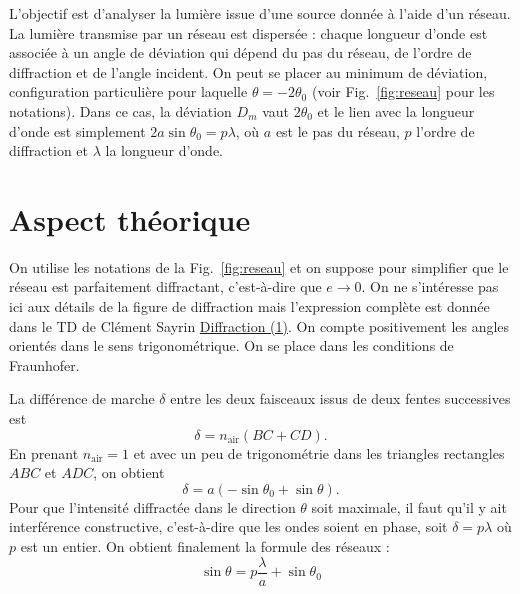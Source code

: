 \documentclass[12pt,a4paper]{article}
\begin{document}
L'objectif est d'analyser la lumière issue d'une source donnée à l'aide d'un réseau.
La lumière transmise par un réseau est dispersée : chaque longueur d'onde est associée à un angle de déviation qui dépend du pas du réseau, de l'ordre de diffraction et de l'angle incident.
On peut se placer au minimum de déviation, configuration particulière pour laquelle $\theta = -2\theta_0$ (voir Fig.~\ref{fig:reseau} pour les notations).
Dans ce cas, la déviation $D_m$ vaut $2\theta_0$ et le lien avec la longueur d'onde est simplement $2a\sin\theta_0=p\lambda$, où $a$ est le pas du réseau, $p$ l'ordre de diffraction et $\lambda$ la longueur d'onde.

\section{Aspect théorique}

On utilise les notations de la Fig.~\ref{fig:reseau} et on suppose pour simplifier que le réseau est parfaitement diffractant, c'est-à-dire que $e \rightarrow 0$.
On ne s'intéresse pas ici aux détails de la figure de diffraction mais l'expression complète est donnée dans le TD de Clément Sayrin \href{http://www.lkb.upmc.fr/cqed/wp-content/uploads/sites/14/2019/10/optique_TD_diffraction_1_corrige.pdf}{Diffraction (1)}.
On compte positivement les angles orientés dans le sens trigonométrique.
On se place dans les conditions de Fraunhofer.

La différence de marche $\delta$ entre les deux faisceaux issus de deux fentes successives est
\begin{equation}
\delta = n_\mathrm{air}(BC+CD).
\end{equation}
En prenant $n_\mathrm{air}=1$ et avec un peu de trigonométrie dans les triangles rectangles $ABC$ et $ADC$, on obtient
\begin{equation}
\delta = a(-\sin\theta_0 + \sin\theta).
\end{equation}
Pour que l'intensité diffractée dans le direction $\theta$ soit maximale, il faut qu'il y ait interférence constructive, c'est-à-dire que les ondes soient en phase, soit $\delta=p\lambda$ où $p$ est un entier.
On obtient finalement la formule des réseaux :
\begin{equation}
\sin\theta = p\frac{\lambda}{a} + \sin\theta_0
\label{eq:reseau}
\end{equation}
\end{document}

